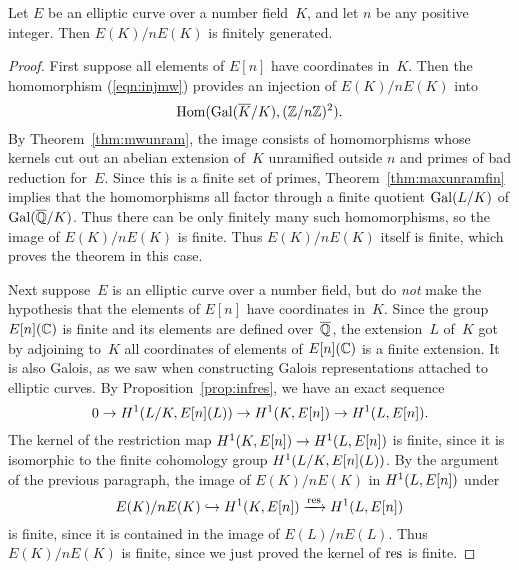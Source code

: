 \begin{theorem}\label{thm:weakMW}
  Let $E$ be an elliptic curve over a number field~$K$, and
  let $n$ be any positive integer.  Then
  $E(K)/nE(K)$ is finitely generated.
\end{theorem}
\begin{proof}
  First suppose all elements of $E[n]$ have coordinates in~$K$.  Then
  the homomorphism (\ref{eqn:injmw}) provides an injection of $E(K)/n
  E(K)$ into
  \[
    \operatorname{Hom}(\operatorname{Gal}(\overline{K}/K), (\mathbb{Z}/n\mathbb{Z})^2).
  \]
  By Theorem~\ref{thm:mwunram}, the image consists of homomorphisms whose
  kernels cut out an abelian extension of~$K$ unramified outside $n$
  and primes of bad reduction for~$E$.  Since this is a finite set of
  primes, Theorem~\ref{thm:maxunramfin} implies that the homomorphisms
  all factor through a finite quotient $\operatorname{Gal}(L/K)$ of $\operatorname{Gal}(\overline{\mathbb{Q}}/K)$.
  Thus there can be only finitely many such homomorphisms, so the
  image of $E(K)/nE(K)$ is finite.  Thus $E(K)/nE(K)$ itself is
  finite, which proves the theorem in this case.
  
  Next suppose~$E$ is an elliptic curve over a number field, but do {\em
    not} make the hypothesis that the elements of $E[n]$ have
  coordinates in~$K$.  Since the group $E[n](\mathbb{C})$ is finite and its
  elements are defined over~$\overline{\mathbb{Q}}$, the extension~$L$ of~$K$ got by
  adjoining to~$K$ all coordinates of elements of $E[n](\mathbb{C})$ is a finite
  extension.  It is also Galois, as we saw when constructing Galois
  representations attached to elliptic curves.
  By Proposition~\ref{prop:infres}, we have an exact sequence
  \[
    0 \to H^1(L/K, E[n](L)) \to H^1(K,E[n])\to H^1(L,E[n]).
  \]
  The kernel of the restriction map
  $H^1(K,E[n])\to H^1(L,E[n])$ is finite, since it is
  isomorphic to the finite cohomology group
  $H^1(L/K, E[n](L))$.  By the argument of the previous
  paragraph, the image of $E(K)/nE(K)$ in $H^1(L,E[n])$
  under
  \[
    E(K)/n E(K) \hookrightarrow H^1(K,E[n]) \xrightarrow{\operatorname{res}} H^1(L,E[n])
  \]
  is finite, since it is contained in the image of $E(L)/n E(L)$.
  Thus $E(K)/n E(K)$ is finite, since we just proved
  the kernel of $\operatorname{res}$ is finite.
\end{proof}
